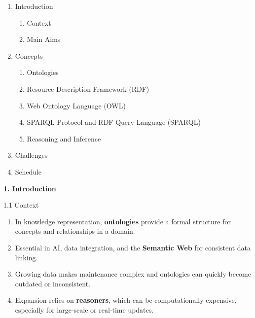 \begin{frame}[plain]
    \begin{bee}[Summary]
        \begin{enumerate}[1.]
            \item Introduction
                \begin{enumerate}[1.]
                    \item Context
                    \item Main Aims
                \end{enumerate}
            \item Concepts
                \begin{enumerate}[1.]
                    \item Ontologies
                    \item Resource Description Framework (RDF)
                    \item Web Ontology Language (OWL)
                    \item SPARQL Protocol and RDF Query Language (SPARQL)
                    \item Reasoning and Inference
                \end{enumerate}
            \item Challenges
            \item Schedule
        \end{enumerate}
    \end{bee} 
\end{frame}

\begin{frame}[plain]
    \begingroup
        \selectfont
        \Huge\color{black}\textbf{1. Introduction}\\[0.6em]
    \endgroup
\end{frame}

\begin{frame}{1.1 Context}
    \begin{bee}
        \begin{enumerate}[$\bullet$]
            \item In knowledge representation, \textbf{ontologies} provide a formal structure for concepts and relationships in a domain.
            \item Essential in AI, data integration, and the \textbf{Semantic Web} for consistent data linking.
            \item Growing data makes maintenance complex and ontologies can quickly become outdated or inconsistent.
            \item Expansion relies on \textbf{reasoners}, which can be computationally expensive, especially for large-scale or real-time updates.
    \end{enumerate}
    \end{bee}
\end{frame}

